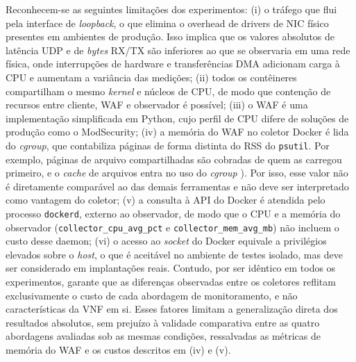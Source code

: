 Reconhecem-se as seguintes limitações dos experimentos: (i) o tráfego que flui pela interface de \textit{loopback}, o que elimina o overhead de drivers de NIC físico presentes em ambientes de produção. Isso implica que os valores absolutos de latência UDP e de \textit{bytes} RX/TX são inferiores ao que se observaria em uma rede física, onde interrupções de hardware e transferências DMA adicionam carga à CPU e aumentam a variância das medições; (ii) todos os contêineres compartilham o mesmo \textit{kernel} e núcleos de CPU, de modo que contenção de recursos entre cliente, WAF e observador é possível; (iii) o WAF é uma implementação simplificada em Python, cujo perfil de CPU difere de soluções de produção como o ModSecurity; (iv) a memória do WAF no coletor Docker é lida do \textit{cgroup}, que contabiliza páginas de forma distinta do RSS do \texttt{psutil}. Por exemplo, páginas de arquivo compartilhadas são cobradas de quem as carregou primeiro, e o \textit{cache} de arquivos entra no uso do \textit{cgroup} \cite{kernel_cgroup_v2}). Por isso, esse valor não é diretamente comparável ao das demais ferramentas e não deve ser interpretado como vantagem do coletor; (v) a consulta à API do Docker é atendida pelo processo \texttt{dockerd}, externo ao observador, de modo que o CPU e a memória do observador (\texttt{collector\_cpu\_avg\_pct} e \texttt{collector\_mem\_avg\_mb}) não incluem o custo desse daemon; (vi) o acesso ao \textit{socket} do Docker equivale a privilégios elevados sobre o \textit{host}, o que é aceitável no ambiente de testes isolado, mas deve ser considerado em implantações reais. Contudo, por ser idêntico em todos os experimentos, garante que as diferenças observadas entre os coletores reflitam exclusivamente o custo de cada abordagem de monitoramento, e não características da VNF em si. Esses fatores limitam a generalização direta dos resultados absolutos, sem prejuízo à validade comparativa entre as quatro abordagens avaliadas sob as mesmas condições, ressalvadas as métricas de memória do WAF e os custos descritos em (iv) e (v).
